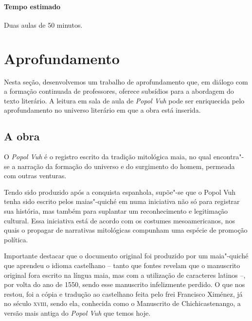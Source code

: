 \documentclass[11pt]{extarticle}
\begin{document}
\paragraph{Tempo estimado} Duas aulas de 50 minutos. 

\section{Aprofundamento}


Nesta seção, desenvolvemos um trabalho de aprofundamento que, em diálogo
com a formação continuada de professores, oferece subsídios para a
abordagem do texto literário. A leitura em sala de aula de \emph{Popol
Vuh} pode ser enriquecida pelo aprofundamento no universo literário em
que a obra está inserida.


\subsection{A obra}

O \textit{Popol Vuh} é o registro escrito da tradição mitológica maia, no qual
encontra"-se a narração da formação do universo e do surgimento do homem,
permeada com outras venturas.

Tendo sido produzido após a conquista espanhola, supõe"-se que o Popol
Vuh tenha sido escrito pelos maias"-quiché em numa iniciativa não só para
registrar sua história, mas também para suplantar um reconhecimento e
legitimação cultural. Essa iniciativa está de acordo com os costumes
mesoamericanos, nos quais o propagar de narrativas mitológicas compunham
uma espécie de promoção política.

Importante destacar que o documento original foi produzido por um
maia"-quiché que aprendeu o idioma castelhano -- tanto que fontes revelam
que o manuscrito original fora escrito na língua maia, mas com a
utilização de caracteres latinos --, por volta do ano de 1550, sendo
esse manuscrito infelizmente perdido. O que nos restou, foi a cópia e
tradução ao castelhano feita pelo frei Francisco Ximénez, já no século
\textsc{xviii}, sendo ela, conhecida como o Manuscrito de Chichicastenango, a
versão mais antiga do \textit{Popol Vuh} que temos hoje.


 
\end{document}
